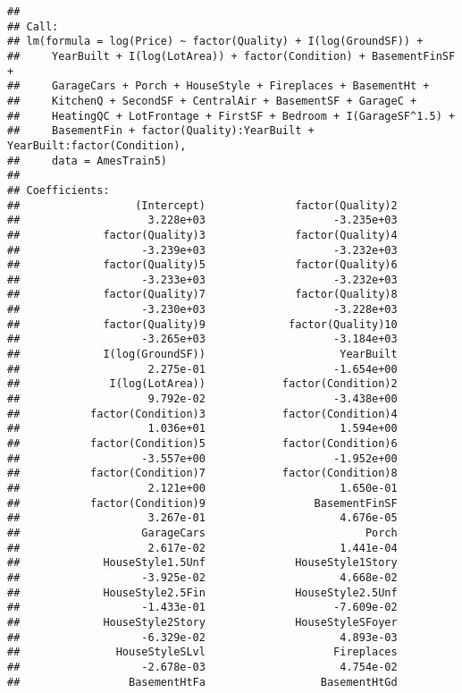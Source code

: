 \documentclass[
]{article}
\begin{document}
\begin{verbatim}
## 
## Call:
## lm(formula = log(Price) ~ factor(Quality) + I(log(GroundSF)) + 
##     YearBuilt + I(log(LotArea)) + factor(Condition) + BasementFinSF + 
##     GarageCars + Porch + HouseStyle + Fireplaces + BasementHt + 
##     KitchenQ + SecondSF + CentralAir + BasementSF + GarageC + 
##     HeatingQC + LotFrontage + FirstSF + Bedroom + I(GarageSF^1.5) + 
##     BasementFin + factor(Quality):YearBuilt + YearBuilt:factor(Condition), 
##     data = AmesTrain5)
## 
## Coefficients:
##                  (Intercept)              factor(Quality)2  
##                    3.228e+03                    -3.235e+03  
##             factor(Quality)3              factor(Quality)4  
##                   -3.239e+03                    -3.232e+03  
##             factor(Quality)5              factor(Quality)6  
##                   -3.233e+03                    -3.232e+03  
##             factor(Quality)7              factor(Quality)8  
##                   -3.230e+03                    -3.228e+03  
##             factor(Quality)9             factor(Quality)10  
##                   -3.265e+03                    -3.184e+03  
##             I(log(GroundSF))                     YearBuilt  
##                    2.275e-01                    -1.654e+00  
##              I(log(LotArea))            factor(Condition)2  
##                    9.792e-02                    -3.438e+00  
##           factor(Condition)3            factor(Condition)4  
##                    1.036e+01                     1.594e+00  
##           factor(Condition)5            factor(Condition)6  
##                   -3.557e+00                    -1.952e+00  
##           factor(Condition)7            factor(Condition)8  
##                    2.121e+00                     1.650e-01  
##           factor(Condition)9                 BasementFinSF  
##                    3.267e-01                     4.676e-05  
##                   GarageCars                         Porch  
##                    2.617e-02                     1.441e-04  
##             HouseStyle1.5Unf              HouseStyle1Story  
##                   -3.925e-02                     4.668e-02  
##             HouseStyle2.5Fin              HouseStyle2.5Unf  
##                   -1.433e-01                    -7.609e-02  
##             HouseStyle2Story              HouseStyleSFoyer  
##                   -6.329e-02                     4.893e-03  
##               HouseStyleSLvl                    Fireplaces  
##                   -2.678e-03                     4.754e-02  
##                 BasementHtFa                  BasementHtGd  

\end{verbatim}
\end{document}

